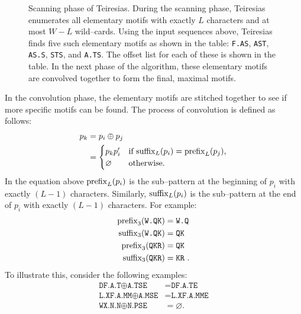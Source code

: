\begin{figure}[ptb]
            \caption[Scanning phase of Teiresias]{
            Scanning phase of Teiresias.  During the scanning phase, Teiresias enumerates
            all elementary motifs with exactly $L$ characters and at most $W-L$ wild--cards.
            Using the input sequences above, Teiresias finds five such elementary motifs
            as shown in the table: \texttt{F.AS}, \texttt{AST}, \texttt{AS.S}, \texttt{STS}, and
            \texttt{A.TS}.  The offset list for each of these is shown in the table.
            In the next phase of the algorithm, these elementary motifs are convolved
            together to form the final, maximal motifs.}
            \label{fig:teiresiasExample}
            \end{figure}

            In the convolution phase, the elementary motifs are
            stitched together to see if more specific motifs can be
            found.  The process of convolution is defined as
            follows:
    \begin{equation}\label{eqn:convolution}
    \begin{split}
        p_k &= p_i \oplus p_j\\
        & =
        \begin{cases}
        p_k p_i' & \text{if $\operatorname{suffix}_L(p_i)=\operatorname{prefix}_L(p_j)$,}\\
        \varnothing & \text{otherwise.}
        \end{cases}
    \end{split}
    \end{equation}
    In the equation above $\operatorname{prefix}_L(p_i)$ is  the sub--pattern
    at the beginning of
    $p_i$ with exactly $(L-1)$ characters.  Similarly, $\operatorname{suffix}_L(p_i)$ is  the sub--pattern
    at the end of
    $p_i$ with exactly $(L-1)$ characters.  For example:
    \begin{equation}\label{eqn:prefixsuffix}
        \begin{split}
          \operatorname{prefix}_3(\texttt{W.QK}) & = \texttt{W.Q} \\
          \operatorname{suffix}_3(\texttt{W.QK}) & = \texttt{QK} \\
          \operatorname{prefix}_3(\texttt{QKR}) & = \texttt{QK} \\
          \operatorname{suffix}_3(\texttt{QKR}) & = \texttt{KR}~.
        \end{split}
    \end{equation}
    To illustrate this, consider the following examples:
    \begin{equation*}
    \begin{split}
        \texttt{DF.A.T}\oplus\texttt{A.TSE}&=\texttt{DF.A.TE}\\
        \texttt{L.XF.A.MM}\oplus\texttt{A.MSE}&=\texttt{L.XF.A.MME}\\
        \texttt{WX.N.N}\oplus\texttt{N.PSE}&=\varnothing.
    \end{split}
    \end{equation*}

